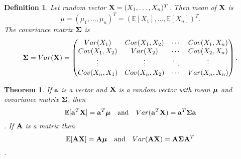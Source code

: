\documentclass[11pt]{article}
\def\A{{\bf A}}
\def\a{{\bf a}}
\def\X{{\bf X}}
\def\BE{{\mathbb E}}
\def\muu{\mbox{\boldmath$\mu$\unboldmath}}
\def\Si{\mbox{\boldmath$\Sigma$\unboldmath}}
\newtheorem{theorem}{Theorem}[section]
\newtheorem{definition}{Definition}[section]
\begin{document}
\begin{definition}
	Let random vector $\X=(X_1,\dots,X_n)^T$. Then mean of $\X$ is 
		$$\mu=(\mu_1,\dots,\mu_n)^T=(\BE[X_1],\dots,\BE[X_n])^T.$$
	The covariance matrix $\Si$ is
		$$\Si = Var(\X) = 
			\begin{pmatrix}
				Var(X_1)		& Cov(X_1,X_2)	& \cdots 	& Cov(X_1,X_n)\\
				Cov(X_1,X_2)	& Var(X_2)	 	& \cdots 	& Cov(X_2,X_n)\\	
				\vdots 		& \vdots 		& \ddots 	& \vdots\\
				Cov(X_n,X_1) 	& Cov(X_n,X_2)& \cdots 	& Var(X_n,X_n)
			\end{pmatrix}.
		$$
\end{definition}
\begin{theorem}
	If $\a$ is a vector and $\X$ is a random vector with mean $\muu$ and covariance matrix $\Si$, then
		$$\BE[\a^T\X]=\a^T\muu \quad \text{and} \quad Var(\a^T\X)=\a^T\Si\a$$.
	If $\A$ is a matrix then
		$$\BE[\A\X] = \A\muu  \quad \text{and} \quad Var(\A\X) = \A\Si\A^T$$.
\end{theorem}
\end{document}
